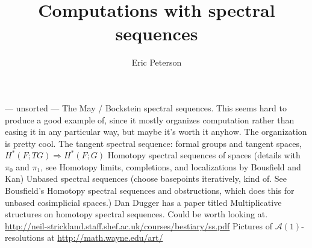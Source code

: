 \documentclass[letter]{book}
\title{Computations with spectral sequences}
\author{Eric Peterson}
\date{}
\begin{document}
\maketitle
\tableofcontents
\clearpage










--- unsorted ---
The May / Bockstein spectral sequences.  This seems hard to produce a good example of, since it mostly organizes computation rather than easing it in any particular way, but maybe it's worth it anyhow.  The organization is pretty cool.
The tangent spectral sequence: formal groups and tangent spaces, $H^*(F; TG) \Rightarrow H^*(F; G)$
Homotopy spectral sequences of spaces (details with $\pi_0$ and $\pi_1$, see Homotopy limits, completions, and localizations by Bousfield and Kan)
Unbased spectral sequences (choose basepoints iteratively, kind of. See Bousfield's Homotopy spectral sequences and obstructions, which does this for unbased cosimplicial spaces.)
Dan Dugger has a paper titled Multiplicative structures on homotopy spectral sequences. Could be worth looking at.
\url{http://neil-strickland.staff.shef.ac.uk/courses/bestiary/ss.pdf}
Pictures of $\mathcal{A}(1)$-resolutions at \url{http://math.wayne.edu/art/}
\end{document}
